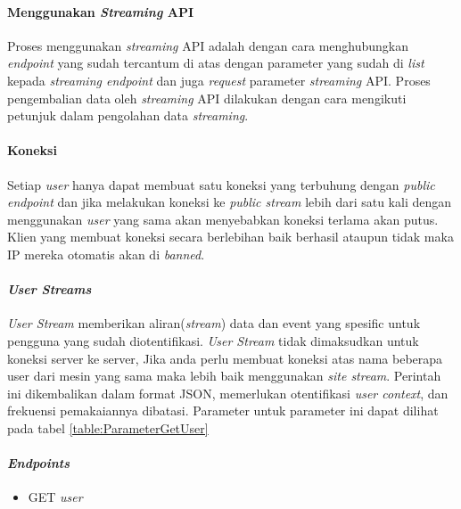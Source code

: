 \paragraph{Menggunakan \textit{Streaming} API}
Proses menggunakan \textit{streaming} API adalah dengan cara menghubungkan \textit{endpoint} yang sudah tercantum di atas dengan parameter yang sudah di \textit{list} kepada \textit{streaming endpoint} dan juga \textit{request} parameter \textit{streaming} API. Proses pengembalian data oleh \textit{streaming} API dilakukan dengan cara mengikuti petunjuk dalam pengolahan data \textit{streaming}.

\paragraph{Koneksi}
Setiap \textit{user} hanya dapat membuat satu koneksi yang terbuhung dengan \textit{public endpoint} dan jika melakukan koneksi ke \textit{public stream} lebih dari satu kali dengan menggunakan \textit{user} yang sama akan menyebabkan koneksi terlama akan putus. Klien yang membuat koneksi secara berlebihan baik berhasil ataupun tidak maka IP mereka otomatis akan di \textit{banned}.

\paragraph{\textit{User Streams}}
\textit{User Stream} memberikan aliran(\textit{stream}) data dan event yang spesific untuk pengguna yang sudah diotentifikasi. \textit{User Stream} tidak dimaksudkan untuk koneksi server ke server, Jika anda perlu membuat koneksi atas nama beberapa user dari mesin yang sama maka lebih baik menggunakan \textit{site stream}. Perintah ini dikembalikan dalam format JSON, memerlukan otentifikasi \textit{user context}, dan frekuensi pemakaiannya dibatasi. Parameter untuk parameter ini dapat dilihat pada tabel \ref{table:ParameterGetUser}


\paragraph{\textit{Endpoints}}
\begin{itemize}
	\item GET \textit{user}
\end{itemize}

